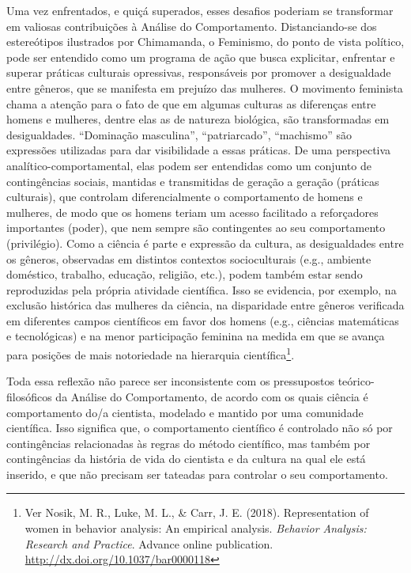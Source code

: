Uma vez enfrentados, e quiçá superados, esses desafios poderiam se transformar em valiosas contribuições à Análise do Comportamento. Distanciando-se dos estereótipos ilustrados por Chimamanda, o Feminismo, do ponto de vista político, pode ser entendido como um programa de ação que busca explicitar, enfrentar e superar práticas culturais opressivas, responsáveis por promover a desigualdade entre gêneros, que se manifesta em prejuízo das mulheres. O movimento feminista chama a atenção para o fato de que em algumas culturas as diferenças entre homens e mulheres, dentre elas as de natureza biológica, são transformadas em desigualdades. “Dominação masculina”, “patriarcado”, “machismo” são expressões utilizadas para dar visibilidade a essas práticas. De uma perspectiva analítico-comportamental, elas podem ser entendidas como um conjunto de contingências sociais, mantidas e transmitidas de geração a geração (práticas culturais), que controlam diferencialmente o comportamento de homens e mulheres, de modo que os homens teriam um acesso facilitado a reforçadores importantes (poder), que nem sempre são contingentes ao seu comportamento (privilégio). 
Como a ciência é parte e expressão da cultura, as desigualdades entre os gêneros, observadas em distintos contextos socioculturais (e.g., ambiente doméstico, trabalho, educação, religião, etc.), podem também estar sendo reproduzidas pela própria atividade científica. Isso se evidencia, por exemplo, na exclusão histórica das mulheres da ciência, na disparidade entre gêneros verificada em diferentes campos científicos em favor dos homens (e.g., ciências matemáticas e tecnológicas) e na menor participação feminina na medida em que se avança para posições de mais notoriedade na hierarquia científica\footnote{Ver Nosik, M. R., Luke, M. L., \& Carr, J. E. (2018). Representation of women in behavior analysis: An empirical analysis. \emph{Behavior Analysis: Research and Practice}. Advance online publication. \url{http://dx.doi.org/10.1037/bar0000118}}. 

Toda essa reflexão não parece ser inconsistente com os pressupostos teórico-filosóficos da Análise do Comportamento, de acordo com os quais ciência é comportamento do/a cientista, modelado e mantido por uma comunidade científica. Isso significa que, o comportamento científico é controlado não só por contingências relacionadas às regras do método científico, mas também por contingências da história de vida do cientista e da cultura na qual ele está inserido, e que não precisam ser tateadas para controlar o seu comportamento.

